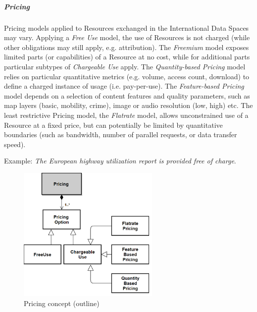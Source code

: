 \subparagraph*{Pricing}
Pricing models applied to Resources exchanged in the International Data Spaces may vary. Applying a \textit{Free Use }model, the use of Resources is not charged (while other obligations may still apply, e.g. attribution). The \textit{Freemium} model exposes limited parts (or capabilities) of a Resource at no cost, while for additional parts particular subtypes of \textit{Chargeable Use} apply. The \textit{Quantity-based Pricing} model relies on particular quantitative metrics (e.g. volume, access count, download) to define a charged instance of usage (i.e. pay-per-use). The \textit{Feature-based Pricing} model depends on a selection of content features and quality parameters, such as map layers (basic, mobility, crime), image or audio resolution (low, high) etc. The least restrictive Pricing model, the \textit{Flatrate} model, allows unconstrained use of a Resource at a fixed price, but can potentially be limited by quantitative boundaries (such as bandwidth, number of parallel requests, or data transfer speed).

 Example: \textit{The European highway utilization report is provided free of charge}.



\begin{figure}[H]
	\begin{Center}
		\includegraphics[width=2.7in,height=2.6in]{./media/image47.png}
		\caption{Pricing concept (outline)}
		\label{fig:Pricing_concept_outline}
	\end{Center}
\end{figure}





